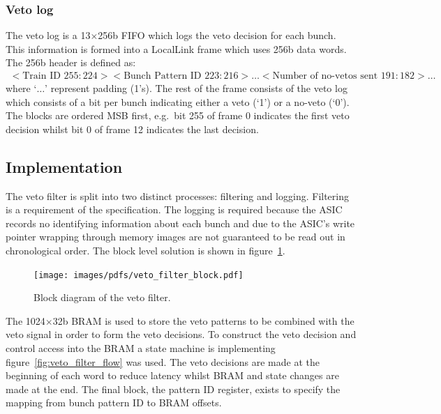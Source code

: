 \subsubsection{Veto log} %
\label{sub:veto_locallink}
The veto log is a 13\( \times \)256b FIFO which logs the veto decision for each bunch. This information is formed into a LocalLink frame which uses 256b data words. The 256b header is defined as:
\begin{align}\label{fmt:ll_header}
  <\text{Train ID } 255:224><\text{Bunch Pattern ID } 223:216>\ldots<\text{Number of no-vetos sent } 191:182> \ldots
\end{align}
where `\( \dots \)' represent padding (1's). The rest of the frame consists of the veto log which consists of a bit per bunch indicating either a veto (`1') or a no-veto (`0'). The blocks are ordered MSB first, e.g.\ bit 255 of frame 0 indicates the first veto decision whilst bit 0 of frame 12 indicates the last decision. 
\subsection{Implementation} %
\label{sub:veto_implementation}
The veto filter is split into two distinct processes: filtering and logging. Filtering is a requirement of the specification. The logging is required because the ASIC records no identifying information about each bunch and due to the ASIC's write pointer wrapping through memory images are not guaranteed to be read out in chronological order. The block level solution is shown in figure~\ref{fig:veto_filter_block}.
    
\begin{figure}[htbp]
  \centering
  \texttt{[image: images/pdfs/veto\_filter\_block.pdf]}
  \caption{Block diagram of the veto filter.}
  \label{fig:veto_filter_block}
\end{figure}
    
The  1024\( \times \)32b BRAM is used to store the veto patterns to be combined with the veto signal in order to form the veto decisions. To construct the veto decision and control access into the BRAM a state machine is implementing figure~\ref{fig:veto_filter_flow} was used. The veto decisions are made at the beginning of each word to reduce latency whilst BRAM and state changes are made at the end. The final block, the pattern ID register, exists to specify the mapping from bunch pattern ID to BRAM offsets.
    
